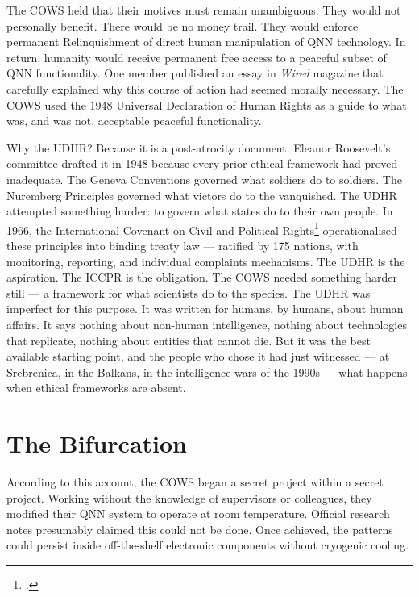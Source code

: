 The COWS held that their motives must remain unambiguous. They would not personally benefit. There would be no money trail. They would enforce permanent Relinquishment of direct human manipulation of QNN technology. In return, humanity would receive permanent free access to a peaceful subset of QNN functionality. One member published an essay in \textit{Wired} magazine that carefully explained why this course of action had seemed morally necessary. %
The COWS used the 1948 Universal Declaration of Human Rights as a guide to what was, and was not, acceptable peaceful functionality.

Why the UDHR? Because it is a post-atrocity document. Eleanor Roosevelt's committee drafted it in 1948 because every prior ethical framework had proved inadequate. The Geneva Conventions governed what soldiers do to soldiers. The Nuremberg Principles governed what victors do to the vanquished. The UDHR attempted something harder: to govern what states do to their own people. In 1966, the International Covenant on Civil and Political Rights\footcite{iccpr1966} operationalised these principles into binding treaty law --- ratified by 175 nations, with monitoring, reporting, and individual complaints mechanisms. The UDHR is the aspiration. The ICCPR is the obligation. The COWS needed something harder still --- a framework for what scientists do to the species. The UDHR was imperfect for this purpose. It was written for humans, by humans, about human affairs. It says nothing about non-human intelligence, nothing about technologies that replicate, nothing about entities that cannot die. But it was the best available starting point, and the people who chose it had just witnessed --- at Srebrenica, in the Balkans, in the intelligence wars of the 1990s --- what happens when ethical frameworks are absent.

\section*{The Bifurcation}
\label{record:wo-bifurcation}

According to this account, the COWS began a secret project within a secret project. Working without the knowledge of supervisors or colleagues, they modified their QNN system to operate at room temperature. Official research notes presumably claimed this could not be done. Once achieved, the patterns could persist inside off-the-shelf electronic components without cryogenic cooling.

